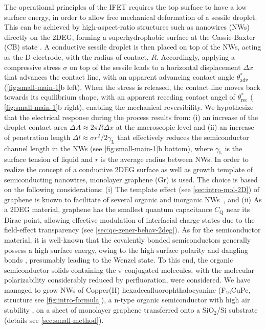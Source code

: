 The operational principles of the IFET requires the top surface to
have a low surface energy, in order to allow free mechanical
deformation of a sessile droplet.
%
This can be achieved by high-aspect-ratio structures such as nanowires (NWs)~\autocite{Yang_2010_rev_NW} directly on the 2DEG,
forming a superhydrophobic surface at the Cassie-Baxter (CB) state
\autocite{Cassie_1944_wet}.
%
A conductive sessile droplet is then placed on top
of the NWs, acting as the D electrode, with the radius of contact,
\(R\).
%
Accordingly, applying a compressive stress \(\sigma\) on top
of the sessile leads to a horizontal displacement \(\Delta x\) that
advances the contact line, with an apparent advancing contact angle
\(\theta_{\mathrm{adv}}^{*}\) (\autoref{fig:small-main-1}b left).
%
When the
stress is released, the contact line moves back towards its
equilibrium shape, with an apparent receding contact angel of
\(\theta_{\mathrm{rec}}^{*}\) ( \autoref{fig:small-main-1}b right), enabling the
mechanical reversibility.
%
We hypothesize that the electrical response during the
process results from: (i) an increase of the droplet contact area
\(\Delta A \approx 2 \pi R \Delta x\) at the macroscopic level and (ii)
an increase of penetration length \(\Delta l \approx \sigma
r^{2}/2\gamma_{\mathrm{L}}\) that effectively reduces the semiconductor
channel length in the NWs (see \autoref{fig:small-main-1}b bottom), where
\(\gamma_{\mathrm{L}}\) is the surface tension of liquid and \(r\) is the
average radius between NWs.
%
In order to realize the concept of a conductive 2DEG surface as well
as growth template of semiconducting nanowires, monolayer graphene (Gr) is used.
%
The choice is based on the following considerations: (i) The template
effect (see \autoref{sec:intro-mol-2D}) of graphene is known to
facilitate of several organic and inorganic
NWs~\autocite{Huang_2016_laury_nanowire_gr,Wang_2015_vertical_nanowire_gr,Fu_2012_gr_ZnONW},
and (ii) As a 2DEG material, graphene has the smallest quantum
capacitance $C_{\mathrm{Q}}$ near its Dirac point, allowing effective
modulation of interfacial charge states due to the field-effect
transparency (see \autoref{sec:qc-gener-behav-2deg}).
%
As for the semiconductor material, it is well-known
that the covalently bonded semiconductors generally possess a high
surface energy, owing to the high surface polarity
\autocite{Azimi_2013_wetting_RO} and dangling bonds
\autocite{Zhang_2004_dangling}, presumably leading to the Wenzel state.
%
To
this end, the organic semiconductor solids containing the
\(\pi\)-conjugated molecules, with the molecular polarizability
considerably reduced by perfluoration, were considered.
%
We have managed to grow NWs of Copper(II) hexadeca\-fluoro\-phthalocyanine
(F\(_{\text{16}}\)CuPc, structure see \autoref{fig:intro-formula}), a
n-type organic semiconductor with high air stability
\autocite{Bao_1998_FCuPC}, on a sheet of monolayer graphene transferred
onto a SiO\(_{\text{2}}\)/Si substrate (details see
\autoref{sec:small-method}).

